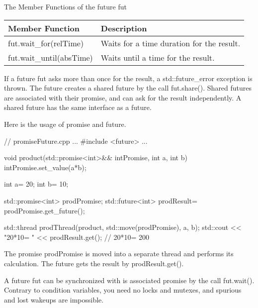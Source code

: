 \begin{center}
The Member Functions of the future fut
\end{center}

\begin{longtable}[c]{|l|l|}
\hline
\textbf{Member Function} & \textbf{Description}                      \\ \hline
\endfirsthead
%
\endhead
%
fut.wait\_for(relTime)   & Waits for a time duration for the result. \\ \hline
fut.wait\_until(absTime) & Waits until a time for the result.        \\ \hline
\end{longtable}

If a future fut asks more than once for the result, a std::future\_error exception is thrown. The future creates a shared future by the call fut.share(). Shared futures are associated with their promise, and can ask for the result independently. A shared future has the same interface as a future.

Here is the usage of promise and future.


\begin{cpp}
// promiseFuture.cpp
...
#include <future>
...

void product(std::promise<int>&& intPromise, int a, int b){
	intPromise.set_value(a*b);
}

int a= 20;
int b= 10;

std::promise<int> prodPromise;
std::future<int> prodResult= prodPromise.get_future();

std::thread prodThread(product, std::move(prodPromise), a, b);
std::cout << "20*10= " << prodResult.get(); // 20*10= 200
\end{cpp}

The promise prodPromise is moved into a separate thread and performs its calculation. The future gets the result by prodResult.get().


A future fut can be synchronized with is associated promise by the call fut.wait(). Contrary to condition variables, you need no locks and mutexes, and spurious and lost wakeups are impossible.

